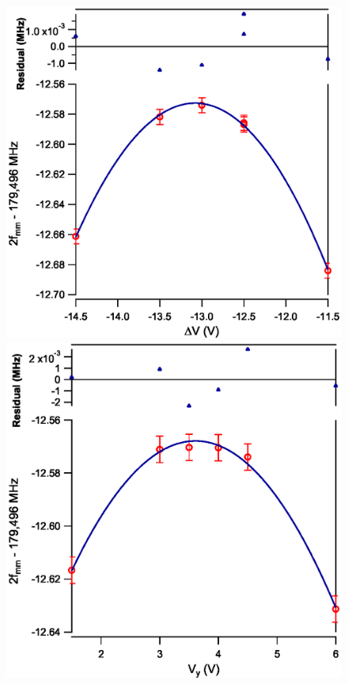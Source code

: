 \documentclass[landscape]{sciposter}
\begin{document}
\begin{multicols}{4}
\begin{figure}
\begin{center}
\includegraphics[scale = 0.8]{deltaV.eps}
\includegraphics[scale = 0.8]{Vy.eps}
\caption{}
\label{nulling}
\end{center}
\end{figure}


\end{multicols}
\end{document}
